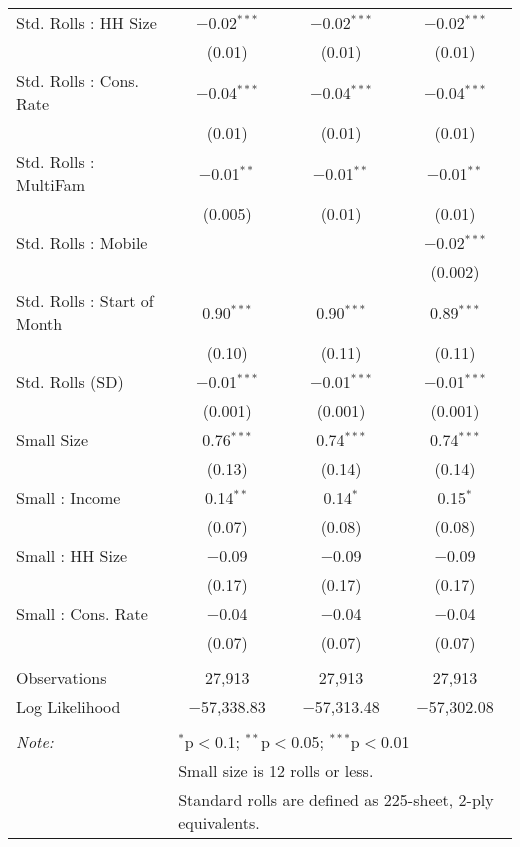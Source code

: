 \begin{table}[!htbp]
\begin{tabular}{@{\extracolsep{5pt}}lccc}
  Std. Rolls : HH Size & $-$0.02$^{***}$ & $-$0.02$^{***}$ & $-$0.02$^{***}$ \\ 
  & (0.01) & (0.01) & (0.01) \\ 
  Std. Rolls : Cons. Rate & $-$0.04$^{***}$ & $-$0.04$^{***}$ & $-$0.04$^{***}$ \\ 
  & (0.01) & (0.01) & (0.01) \\ 
  Std. Rolls : MultiFam & $-$0.01$^{**}$ & $-$0.01$^{**}$ & $-$0.01$^{**}$ \\ 
  & (0.005) & (0.01) & (0.01) \\ 
  Std. Rolls : Mobile &  &  & $-$0.02$^{***}$ \\ 
  &  &  & (0.002) \\ 
  Std. Rolls : Start of Month & 0.90$^{***}$ & 0.90$^{***}$ & 0.89$^{***}$ \\ 
  & (0.10) & (0.11) & (0.11) \\ 
  Std. Rolls (SD) & $-$0.01$^{***}$ & $-$0.01$^{***}$ & $-$0.01$^{***}$ \\ 
  & (0.001) & (0.001) & (0.001) \\ 
  Small Size & 0.76$^{***}$ & 0.74$^{***}$ & 0.74$^{***}$ \\ 
  & (0.13) & (0.14) & (0.14) \\ 
  Small : Income & 0.14$^{**}$ & 0.14$^{*}$ & 0.15$^{*}$ \\ 
  & (0.07) & (0.08) & (0.08) \\ 
  Small : HH Size & $-$0.09 & $-$0.09 & $-$0.09 \\ 
  & (0.17) & (0.17) & (0.17) \\ 
  Small : Cons. Rate & $-$0.04 & $-$0.04 & $-$0.04 \\ 
  & (0.07) & (0.07) & (0.07) \\ 
 \hline \\[-1.8ex] 
Observations & 27,913 & 27,913 & 27,913 \\ 
Log Likelihood & $-$57,338.83 & $-$57,313.48 & $-$57,302.08 \\ 
\hline 
\hline \\[-1.8ex] 
\textit{Note:}  & \multicolumn{3}{l}{$^{*}$p$<$0.1; $^{**}$p$<$0.05; $^{***}$p$<$0.01} \\ 
 & \multicolumn{3}{l}{Small size is 12 rolls or less.} \\ 
 & \multicolumn{3}{l}{Standard rolls are defined as 225-sheet, 2-ply equivalents.} \\ 
\end{tabular} 
\end{table} 
